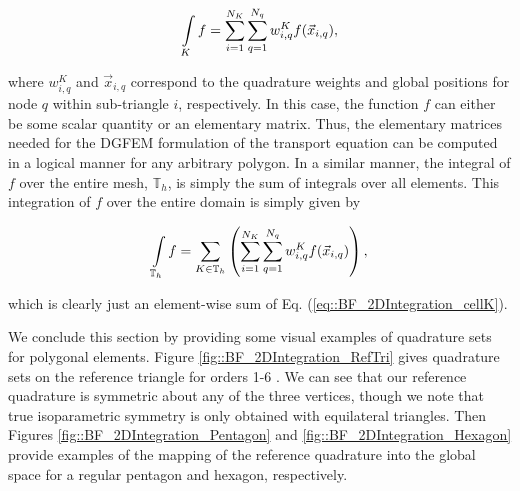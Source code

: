 \begin{equation}
\label{eq::BF_2DIntegration_cellK}
\int\displaylimits_{K} f = \sum_{i=1}^{N_K} \sum_{q=1}^{N_q} w_{i,q}^K f (\vec{x}_{i,q}) ,
\end{equation}

\noindent where $w_{i,q}^K$ and $\vec{x}_{i,q}$ correspond to the quadrature weights and global positions for node $q$ within sub-triangle $i$, respectively. In this case, the function $f$ can either be some scalar quantity or an elementary matrix. Thus, the elementary matrices needed for the DGFEM formulation of the transport equation can be computed in a logical manner for any arbitrary polygon. In a similar manner, the integral of $f$ over the entire mesh, $\mathbb{T}_h$, is simply the sum of integrals over all elements. This integration of $f$ over the entire domain is simply given by

\begin{equation}
\label{eq::BF_2DIntegration_domain}
\int\displaylimits_{\mathbb{T}_h} f = \sum_{K \in \mathbb{T}_h} \left( \sum_{i=1}^{N_K} \sum_{q=1}^{N_q} w_{i,q}^K f (\vec{x}_{i,q}) \right) ,
\end{equation}

\noindent which is clearly just an element-wise sum of Eq. (\ref{eq::BF_2DIntegration_cellK}).

We conclude this section by providing some visual examples of quadrature sets for polygonal elements. Figure \ref{fig::BF_2DIntegration_RefTri} gives quadrature sets on the reference triangle for orders 1-6 \cite{dunavant1985high}. We can see that our reference quadrature is symmetric about any of the three vertices, though we note that true isoparametric symmetry is only obtained with equilateral triangles. Then Figures \ref{fig::BF_2DIntegration_Pentagon} and \ref{fig::BF_2DIntegration_Hexagon} provide examples of the mapping of the reference quadrature into the global space for a regular pentagon and hexagon, respectively. 

